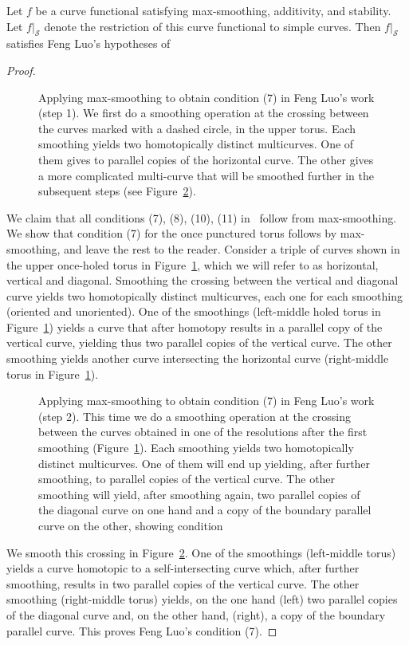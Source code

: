 \begin{proposition}
Let $f$ be a curve functional satisfying max-smoothing, additivity, and stability. Let $f|_{\mathcal{S}}$ denote the restriction of this curve functional to simple curves.
Then $f|_{\mathcal{S}}$ satisfies Feng Luo's hypotheses of \cite[Theorem~5.1]{Lu10}
\label{prop:feng}
\end{proposition}
\begin{proof}
  \begin{figure}
\caption{Applying max-smoothing to obtain condition (7) in Feng Luo's work (step 1). We first do a smoothing operation at the crossing between the curves marked with a dashed circle, in the upper torus. Each smoothing yields two homotopically distinct multicurves. One of them gives to parallel copies of the horizontal curve. The other gives a more complicated multi-curve that will be smoothed further in the subsequent steps (see Figure~\ref{fig:luo2}).
}
\label{fig:luo1}
\end{figure}

We claim that all conditions (7), (8), (10), (11) in~\cite[Theorem~5.1]{Lu10} follow from max-smoothing.
We show that condition (7) for the once punctured torus follows by max-smoothing, and leave the rest to the reader. Consider a triple of curves shown in the upper once-holed torus in Figure~\ref{fig:luo1}, which we will refer to as horizontal, vertical and diagonal. Smoothing the crossing between the vertical and diagonal curve yields two homotopically distinct multicurves, each one for each smoothing (oriented and unoriented).
One of the smoothings (left-middle holed torus in Figure~\ref{fig:luo1}) yields a curve that after homotopy results in a parallel copy of the vertical curve, yielding thus two parallel copies of the vertical curve. The other smoothing yields another curve intersecting the horizontal curve (right-middle torus in Figure~\ref{fig:luo1}).

  \begin{figure}
\caption{Applying max-smoothing to obtain condition (7) in Feng Luo's work (step 2). This time we do a smoothing operation at the crossing between the curves obtained in one of the resolutions after the first smoothing (Figure~\ref{fig:luo1}). Each smoothing yields two homotopically distinct multicurves. One of them will end up yielding, after further smoothing, to parallel copies of the vertical curve. The other smoothing will yield, after smoothing again, two parallel copies of the diagonal curve on one hand and a copy of the boundary parallel curve on the other, showing condition 
}
\label{fig:luo2}
\end{figure}
We smooth this crossing in  Figure~\ref{fig:luo2}. One of the smoothings (left-middle torus) yields a curve homotopic to a self-intersecting curve which, after further smoothing, results in two parallel copies of the vertical curve.
The other smoothing (right-middle torus) yields, on the one hand (left) two parallel copies of the diagonal curve and, on the other hand, (right),  a copy of the boundary parallel curve. This proves Feng Luo's condition (7).
\end{proof}

